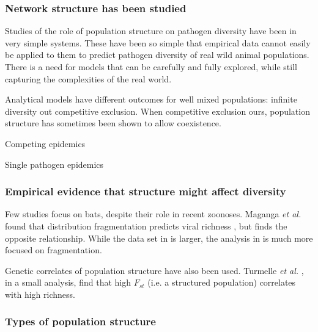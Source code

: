 \subsubsection{Network structure has been studied}
 

Studies of the role of population structure on pathogen diversity have been in very simple systems.
These have been so simple that empirical data cannot easily be applied to them to predict pathogen diversity of real wild animal populations.
There is a need for models that can be carefully and fully explored, while still capturing the complexities of the real world.

Analytical models have different outcomes for well mixed populations: infinite diversity out competitive exclusion.
When competitive exclusion ours, population structure has sometimes been shown to allow coexistence.



Competing epidemics

  \cite{poletto2013host, poletto2015characterising, karrer2011competing}

Single pathogen epidemics






\subsubsection{Empirical evidence that structure might affect diversity}




Few studies focus on bats, despite their role in recent zoonoses.
Maganga \emph{et al.} found that distribution fragmentation predicts viral richness \cite{maganga2014bat}, but \cite{gay2014parasite} finds the opposite relationship. 
While the data set in \cite{gay2014parasite} is larger, the analysis in \cite{maganga2014bat} is much more focused on fragmentation.

Genetic correlates of population structure have also been used.
Turmelle \emph{et al.} \cite{turmelle2009correlates}, in a small analysis, find that high $F_{st}$ (i.e. a structured population) correlates with high richness.



\subsubsection{Types of population structure}

